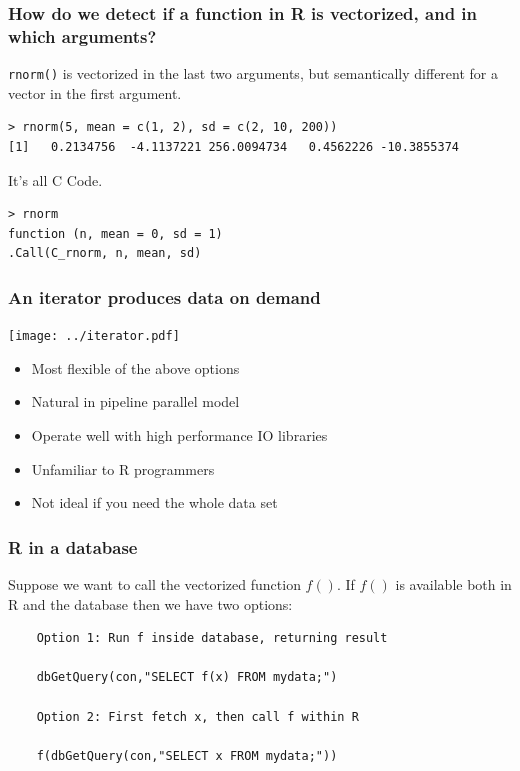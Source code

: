 \documentclass{beamer}
\begin{document}
\begin{frame}[fragile]

    \frametitle{How do we detect if a function in R is vectorized, and in
    which arguments?}

    \texttt{rnorm()} is vectorized in the last two arguments, but
    semantically different for a vector in the first argument.

\begin{verbatim}
> rnorm(5, mean = c(1, 2), sd = c(2, 10, 200))
[1]   0.2134756  -4.1137221 256.0094734   0.4562226 -10.3855374
\end{verbatim}

It's all C Code.

\begin{verbatim}
> rnorm
function (n, mean = 0, sd = 1)
.Call(C_rnorm, n, mean, sd)
\end{verbatim}

\end{frame}
\begin{frame}

    \frametitle{An iterator produces data on demand}

    \centerline{\texttt{[image: ../iterator.pdf]}}

    \begin{itemize}
        \item Most flexible of the above options
        \item Natural in pipeline parallel model
        \item Operate well with high performance IO libraries
    \end{itemize}

    \pause

    \begin{itemize}
        \item Unfamiliar to R programmers
        \item Not ideal if you need the whole data set
    \end{itemize}

\end{frame}
\begin{frame}[fragile]

    \frametitle{R in a database}

    Suppose we want to call the vectorized function $f()$. If $f()$ is
    available both in R and the database then we have two options:

\begin{verbatim}
    Option 1: Run f inside database, returning result
    
    dbGetQuery(con,"SELECT f(x) FROM mydata;")

    Option 2: First fetch x, then call f within R

    f(dbGetQuery(con,"SELECT x FROM mydata;"))
\end{verbatim}

\end{frame}
\end{document}
